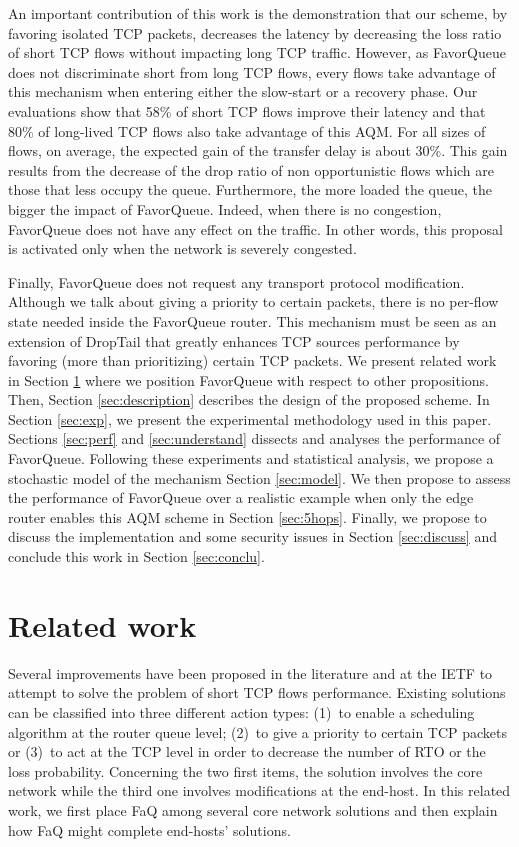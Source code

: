 \documentclass{elsart}
\begin{document}
An important contribution of this work is the demonstration that our scheme, by favoring isolated TCP packets, decreases the latency by decreasing the loss ratio of short TCP flows without impacting long TCP traffic. 
However, as FavorQueue does not discriminate short from long TCP flows, every flows take advantage of this mechanism when entering either the slow-start or a recovery phase. 
Our evaluations show that 58\% of short TCP flows improve their latency and that 80\% of long-lived TCP flows also take advantage of this AQM. For all sizes of flows, on average, the expected gain of the transfer delay is about 30\%. This gain results from the decrease of the drop ratio of non opportunistic flows which are those that less occupy the queue. Furthermore, the more loaded the queue, the bigger the impact of FavorQueue. Indeed, when there is no congestion, FavorQueue does not have any effect on the traffic. In other words, this proposal is activated only when the network is severely congested.

Finally, FavorQueue does not request any transport protocol modification. Although we talk about giving a priority to certain packets, there is no per-flow state needed inside the FavorQueue router. This mechanism must be seen as an extension of DropTail that greatly enhances TCP sources performance by favoring (more than prioritizing) certain TCP packets. 
We present related work in Section \ref{sec:related} where we position FavorQueue with respect to other propositions.
Then, Section \ref{sec:description} describes the design of the proposed scheme. In Section \ref{sec:exp}, we present the experimental methodology used in this paper. Sections \ref{sec:perf} and \ref{sec:understand} dissects and analyses the performance of FavorQueue. Following these experiments and statistical analysis, we propose a stochastic model of the mechanism Section \ref{sec:model}. We then propose to assess the performance of FavorQueue over a realistic example when only the edge router enables this AQM scheme in Section \ref{sec:5hops}. 
Finally, we propose to discuss the implementation and some security issues in Section \ref{sec:discuss} and conclude this work in Section \ref{sec:conclu}.


\section{Related work}
\label{sec:related}

Several improvements have been proposed in the literature and at the IETF to attempt to solve the problem of short TCP flows performance. Existing solutions can be classified into three different action types: (1)~to enable a scheduling algorithm at the router queue level; (2)~to give a priority to certain TCP packets or (3)~to act at the TCP level in order to decrease the number of RTO or the loss probability. Concerning the two first items, the solution involves the core network while the third one involves modifications at the end-host. In this related work, we first place FaQ among several core network solutions and then explain how FaQ might complete end-hosts' solutions. 
\end{document}
